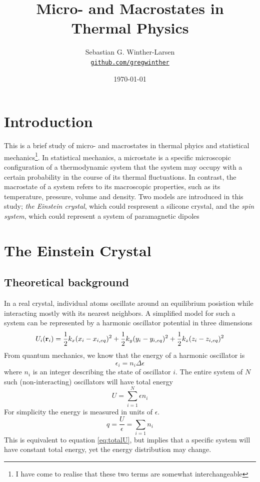 \documentclass[10pt,a4paper]{amsart}
\title[Micro- and Macrostates in Thermal Physics]{Micro- and Macrostates in Thermal Physics \\
	\hrulefill\fbox{FYS2160}\hrulefill}
\author[Winther-Larsen]{Sebastian G. Winther-Larsen\\
\href{https://github.com/gregwinther/FYS2160/}{\texttt{github.com/gregwinther}}}
\date{\today}
\begin{document}
\maketitle

\tableofcontents

\section{Introduction}
This is a brief study of micro- and macrostates in thermal phyics and statistical mechanics\footnote{I have come to realise that these two terms are somewhat interchangeable}. In statistical mechanics, a microstate is a specific microscopic configuration of a thermodynamic system that the system may occupy with a certain probability in the course of its thermal fluctuations. In contrast, the macrostate of a system refers to its macroscopic properties, such as its temperature, pressure, volume and density. Two models are introduced in this study; \emph{the Einstein crystal}, which could respresent a silicone crystal, and the \emph{spin system}, which could represent a system of paramagnetic dipoles

\section{The Einstein Crystal}

\subsection{Theoretical background}
In a real crystal, individual atoms oscillate around an equilibrium posistion while interacting mostly with its nearest neighbors. A simplified model for such a system can be represented by a harmonic oscillator potential in three dimensions
\begin{equation}
U_i(\vb{r}_i)=\frac{1}{2}k_x(x_i-x_{i,eq})^2+\frac{1}{2}k_y(y_i-y_{i,eq})^2+\frac{1}{2}k_z(z_i-z_{i,eq})^2
\end{equation} 
From quantum mechanics, we know that the energy of a harmonic oscillator is
\begin{equation}
\epsilon_i=n_i\Delta \epsilon
\end{equation}
where $n_i$ is an integer describing the state of oscillator $i$. The entire system of $N$ such (non-interacting) oscillators will have total energy
\begin{equation}
\label{eq:totalU}
U=\sum_{i=1}^N \epsilon n_i
\end{equation}
For simplicity the energy is measured in units of $\epsilon$.
\begin{equation}
\label{eq:totalU2}
q = \frac{U}{\epsilon}=\sum_{i=1} n_i
\end{equation}
This is equivalent to equation \ref{eq:totalU}, but implies that a specific system will have constant total energy, yet the energy distribution may change.
\end{document}
